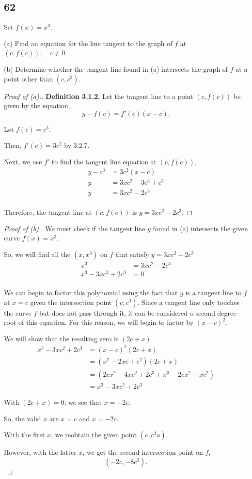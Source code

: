 \documentclass[../hw3.tex]{subfiles}
\begin{document}
\subsection*{62}
Set $f(x)=x^3$.

(a) Find an equation for the line tangent to the graph of $f$ at $(c,f(c)),\quad c \neq 0$.

(b) Determine whether the tangent line found in (a) intersects the graph of $f$ at a point other than $(c,c^3)$.

\begin{proof}[Proof of (a).]
    \textbf{Definition 3.1.2.} Let the tangent line to a point $(c,f(c))$ be given by the equation, \[y-f(c)=f'(c)(x-c).\]

    Let $f(c) = c^3$.
    
    Then, $f'(c) = 3c^2$ by 3.2.7.

    Next, we use $f'$ to find the tangent line equation at $(c,f(c))$,
    \begin{align*}
        y-c^3 &= 3c^2 (x-c) \\
        y &= 3xc^2 - 3c^3 + c^3 \\
        y &= 3xc^2 - 2c^3 \\
    \end{align*}

    Therefore, the tangent line at $(c,f(c))$ is $y = 3xc^2-2c^3$.
\end{proof}

\begin{proof}[Proof of (b).]
    We must check if the tangent line $y$ found in (a) intersects the given curve $f(x) = x^3$.

    So, we will find all the $(x,x^3)$ on $f$ that satisfy $y = 3xc^2-2c^3$
    \begin{align*}
        x^3 &= 3xc^2-2c^3 \\
        x^3-3xc^2+2c^3 &= 0 \\
    \end{align*}

    We can begin to factor this polynomial using the fact that $y$ is a tangent line to $f$ at $x=c$ given the intersection point $(c,c^3)$. Since a tangent line only touches the curve $f$ but does not pass through it, it can be considered a second degree root of this equation. For this reason, we will begin to factor by ${(x-c)}^2$.
   
    We will show that the resulting zero is $(2c+x)$.
    \begin{align*}
        x^3-3xc^2+2c^3 &= {(x-c)}^2 (2c+x) \\
        &= (x^2-2xc+c^2)(2c+x) \\
        &= (2cx^2-4xc^2+2c^3+x^3-2cx^2+xc^2) \\
        &= x^3-3xc^2+2c^3
    \end{align*}

    With $(2c+x) = 0$, we see that $x={-2}c$.

    So, the valid $x$ are $x = c$ and $x = {-2}c$.

    With the first $x$, we reobtain the given point $(c,c^3a)$.

    However, with the latter $x$, we get the second intersection point on $f$,
    \[({-2}c,{-8}c^3).\] 
\end{proof}
\end{document}
